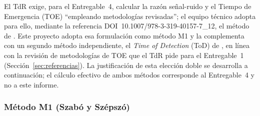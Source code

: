 \documentclass[11pt,a4paper]{article}
\begin{document}
El TdR exige, para el Entregable~4, calcular la raz\'on se\~nal-ruido y el Tiempo de Emergencia (TOE) ``empleando metodolog\'ias revisadas''; el equipo t\'ecnico adopta para ello, mediante la referencia DOI~10.1007/978-3-319-40157-7\_12, el m\'etodo de \citet{szabo2016}. Este proyecto adopta esa formulaci\'on como m\'etodo M1 y la complementa con un segundo m\'etodo independiente, el \emph{Time of Detection} (ToD) de \citet{gopika2024}, en l\'inea con la revisi\'on de metodolog\'ias de TOE que el TdR pide para el Entregable~1 (Secci\'on~\ref{sec:referencias}). La justificaci\'on de esta elecci\'on doble se desarrolla a continuaci\'on; el c\'alculo efectivo de ambos m\'etodos corresponde al Entregable~4 y no a este informe.

\subsubsection{M\'etodo M1 (Szab\'o y Sz\'epsz\'o)}
\end{document}

